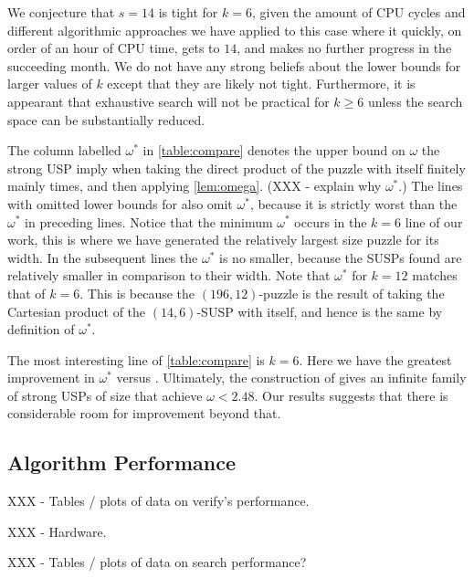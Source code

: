 \documentclass[11pt]{article}
\begin{document}
We conjecture that $s = 14$ is tight for $k = 6$, given the amount of
CPU cycles and different algorithmic approaches we have applied to
this case where it quickly, on order of an hour of CPU time, gets to
$14$, and makes no further progress in the succeeding month.  We do
not have any strong beliefs about the lower bounds for larger values
of $k$ except that they are likely not tight.  Furthermore, it is
appearant that exhaustive search will not be practical for $k \ge 6$
unless the search space can be substantially reduced.

The column labelled $\omega^*$ in \autoref{table:compare} denotes the
upper bound on $\omega$ the strong USP imply when taking the direct
product of the puzzle with itself finitely mainly times, and then
applying \autoref{lem:omega}.  (XXX - explain why $\omega ^*$.)  The
lines with omitted lower bounds for \cite{cksu05} also omit
$\omega^*$, because it is strictly worst than the $\omega^*$ in
preceding lines.  Notice that the minimum $\omega^*$ occurs in the $k
= 6$ line of our work, this is where we have generated the relatively
largest size puzzle for its width.  In the subsequent lines the
$\omega^*$ is no smaller, because the SUSPs found are relatively
smaller in comparison to their width.  Note that $\omega^*$ for $k =
12$ matches that of $k = 6$.  This is because the $(196, 12)$-puzzle
is the result of taking the Cartesian product of the $(14,6)$-SUSP
with itself, and hence is the same by definition of $\omega^*$.

The most interesting line of \autoref{table:compare} is $k = 6$.  Here
we have the greatest improvement in $\omega^*$ versus \cite{cksu05}.
Ultimately, the construction of \cite[Proposition 3.8]{cksu05} gives
an infinite family of strong USPs of size that achieve $\omega <
2.48$. Our results suggests that there is considerable room for
improvement beyond that.


\subsection{Algorithm Performance}
\label{subsec:performance}



XXX - Tables / plots of data on verify's performance.

XXX - Hardware.

XXX - Tables / plots of data on search performance?
\end{document}
